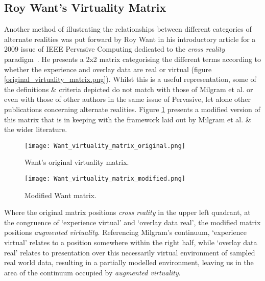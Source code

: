 
\subsection{Roy Want's Virtuality Matrix}

Another method of illustrating the relationships between different categories of alternate realities was put forward by Roy Want in his introductory article for a 2009 issue of IEEE Pervasive Computing dedicated to the \textit{cross reality} paradigm~\cite{Want2009}. He presents a 2x2 matrix categorising the different terms according to whether the experience and overlay data are real or virtual (figure \ref{original_virtuality_matrix.png}). Whilst this is a useful representation, some of the definitions \& criteria depicted do not match with those of Milgram et al. or even with those of other authors in the same issue of Pervasive, let alone other publications concerning alternate realities. Figure \ref{modified_virtuality_matrix.png} presents a modified version of this matrix that is in keeping with the framework laid out by Milgram et al. \& the wider literature.

\begin{figure}[h]
\centering
\begin{minipage}{.5\textwidth}
 	\centering
 	\texttt{[image: Want\_virtuality\_matrix\_original.png]}
 	\caption{Want's original virtuality matrix.}
	\label{original_virtuality_matrix.png}
\end{minipage}%
\begin{minipage}{.5\textwidth}
  \centering
  \texttt{[image: Want\_virtuality\_matrix\_modified.png]}
    \caption{Modified Want matrix.}
    \label{modified_virtuality_matrix.png}
\end{minipage}
\end{figure}

Where the original matrix positions \textit{cross reality} in the upper left quadrant, at the congruence of `experience virtual' and `overlay data real', the modified matrix positions \textit{augmented virtuality}. Referencing Milgram's continuum, `experience virtual' relates to a position somewhere within the right half, while `overlay data real' relates to presentation over this necessarily virtual environment of sampled real world data, resulting in a partially modelled environment, leaving us in the area of the continuum occupied by \textit{augmented virtuality}.

